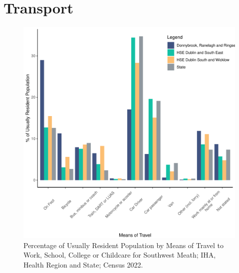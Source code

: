 \documentclass{article}
\begin{document}
\section{Transport}\label{sect:Trans}
\begin{figure}[H]
	\centering
	\includegraphics[width = 120mm]{../figures/TravelED.pdf}
	\caption{Percentage of Usually Resident Population by Means of Travel to Work, School, College or Childcare for Southwest Meath; IHA, Health Region and State; Census 2022.}
	\label{fig:vbnv}
	\end{figure}
\end{document}
